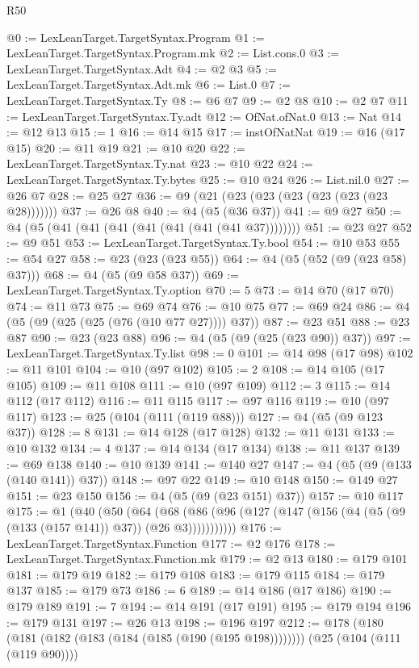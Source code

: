 \begin{lexlean}{R50}
\begin{coremodule}
@0 := LexLeanTarget.TargetSyntax.Program
@1 := LexLeanTarget.TargetSyntax.Program.mk
@2 := List.cons.{0}
@3 := LexLeanTarget.TargetSyntax.Adt
@4 := @2 @3
@5 := LexLeanTarget.TargetSyntax.Adt.mk
@6 := List.{0}
@7 := LexLeanTarget.TargetSyntax.Ty
@8 := @6 @7
@9 := @2 @8
@10 := @2 @7
@11 := LexLeanTarget.TargetSyntax.Ty.adt
@12 := OfNat.ofNat.{0}
@13 := Nat
@14 := @12 @13
@15 := 1
@16 := @14 @15
@17 := instOfNatNat
@19 := @16 (@17 @15)
@20 := @11 @19
@21 := @10 @20
@22 := LexLeanTarget.TargetSyntax.Ty.nat
@23 := @10 @22
@24 := LexLeanTarget.TargetSyntax.Ty.bytes
@25 := @10 @24
@26 := List.nil.{0}
@27 := @26 @7
@28 := @25 @27
@36 := @9 (@21 (@23 (@23 (@23 (@23 (@23 (@23 @28)))))))
@37 := @26 @8
@40 := @4 (@5 (@36 @37))
@41 := @9 @27
@50 := @4 (@5 (@41 (@41 (@41 (@41 (@41 (@41 (@41 @37))))))))
@51 := @23 @27
@52 := @9 @51
@53 := LexLeanTarget.TargetSyntax.Ty.bool
@54 := @10 @53
@55 := @54 @27
@58 := @23 (@23 (@23 @55))
@64 := @4 (@5 (@52 (@9 (@23 @58) @37)))
@68 := @4 (@5 (@9 @58 @37))
@69 := LexLeanTarget.TargetSyntax.Ty.option
@70 := 5
@73 := @14 @70 (@17 @70)
@74 := @11 @73
@75 := @69 @74
@76 := @10 @75
@77 := @69 @24
@86 := @4 (@5 (@9 (@25 (@25 (@76 (@10 @77 @27)))) @37))
@87 := @23 @51
@88 := @23 @87
@90 := @23 (@23 @88)
@96 := @4 (@5 (@9 (@25 (@23 @90)) @37))
@97 := LexLeanTarget.TargetSyntax.Ty.list
@98 := 0
@101 := @14 @98 (@17 @98)
@102 := @11 @101
@104 := @10 (@97 @102)
@105 := 2
@108 := @14 @105 (@17 @105)
@109 := @11 @108
@111 := @10 (@97 @109)
@112 := 3
@115 := @14 @112 (@17 @112)
@116 := @11 @115
@117 := @97 @116
@119 := @10 (@97 @117)
@123 := @25 (@104 (@111 (@119 @88)))
@127 := @4 (@5 (@9 @123 @37))
@128 := 8
@131 := @14 @128 (@17 @128)
@132 := @11 @131
@133 := @10 @132
@134 := 4
@137 := @14 @134 (@17 @134)
@138 := @11 @137
@139 := @69 @138
@140 := @10 @139
@141 := @140 @27
@147 := @4 (@5 (@9 (@133 (@140 @141)) @37))
@148 := @97 @22
@149 := @10 @148
@150 := @149 @27
@151 := @23 @150
@156 := @4 (@5 (@9 (@23 @151) @37))
@157 := @10 @117
@175 := @1
    (@40
      (@50
        (@64
          (@68 (@86 (@96 (@127 (@147 (@156 (@4 (@5 (@9 (@133 (@157 @141)) @37)) (@26 @3)))))))))))
@176 := LexLeanTarget.TargetSyntax.Function
@177 := @2 @176
@178 := LexLeanTarget.TargetSyntax.Function.mk
@179 := @2 @13
@180 := @179 @101
@181 := @179 @19
@182 := @179 @108
@183 := @179 @115
@184 := @179 @137
@185 := @179 @73
@186 := 6
@189 := @14 @186 (@17 @186)
@190 := @179 @189
@191 := 7
@194 := @14 @191 (@17 @191)
@195 := @179 @194
@196 := @179 @131
@197 := @26 @13
@198 := @196 @197
@212 := @178
    (@180 (@181 (@182 (@183 (@184 (@185 (@190 (@195 @198))))))))
    (@25 (@104 (@111 (@119 @90))))

\end{coremodule}
\end{lexlean}

